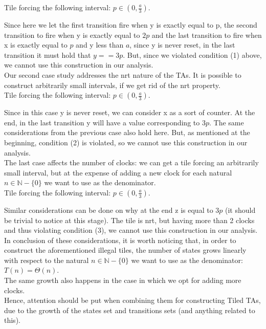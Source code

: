 \documentclass[12pt, a4paper]{article}
\begin{document}
Tile forcing the following interval: $p \in (0, \frac{a}{3})$.



\noindent
Since here we let the first transition fire when y is exactly equal to p, the second transition to fire when y is exactly equal to $2p$ and the last transition to fire when x is exactly equal to $p$ and y less than $a$, since y is never reset, in the last transition it must hold that $y == 3p$. But, since we violated condition (1) above, we cannot use this construction in our analysis.\\

\noindent
Our second case study addresses the nrt nature of the TAs. It is possible to construct arbitrarily small intervals, if we get rid of the nrt property.\\

Tile forcing the following interval: $p \in (0, \frac{a}{3})$.



\noindent
Since in this case y is never reset, we can consider x as a sort of counter. At the end, in the last transition y will have a value corresponding to $3p$. The same considerations from the previous case also hold here. But, as mentioned at the beginning, condition (2) is violated, so we cannot use this construction in our analysis.\\

\noindent
The last case affects the number of clocks: we can get a tile forcing an arbitrarily small interval, but at the expense of adding a new clock for each natural $n \in \mathbb{N}-\{0\}$ we want to use as the denominator.\\

Tile forcing the following interval: $p \in (0, \frac{a}{3})$.



\noindent
Similar considerations can be done on why at the end z is equal to $3p$ (it should be trivial to notice at this stage). The tile is nrt, but having more than 2 clocks and thus violating condition (3), we cannot use this construction in our analysis.\\

\noindent
In conclusion of these considerations, it is worth noticing that, in order to construct the aforementioned illegal tiles, the number of states grows linearly with respect to the natural $n \in \mathbb{N}-\{0\}$ we want to use as the denominator: $T(n) = \Theta(n)$.\\
The same growth also happens in the case in which we opt for adding more clocks.\\
Hence, attention should be put when combining them for constructing Tiled TAs, due to the growth of the states set and transitions sets (and anything related to this).
\end{document}
